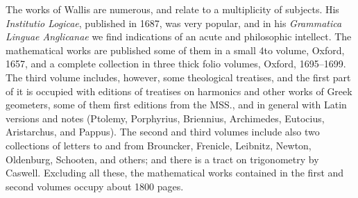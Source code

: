 \documentclass[11pt,a4paper]{article}
\begin{document}
The works of Wallis are numerous, and relate to a multiplicity of subjects. His \textit{Institutio Logicae}, published in 1687, was very popular, and in his \textit{Grammatica Linguae Anglicanae} we find indications of an acute and philosophic intellect. The mathematical works are published some of them in a small 4to volume, Oxford, 1657, and a complete collection in three thick folio volumes, Oxford, 1695--1699. The third volume includes, however, some theological treatises, and the first part of it is occupied with editions of treatises on harmonics and other works of Greek geometers, some of them first editions from the MSS., and in general with Latin versions and notes (Ptolemy, Porphyrius, Briennius, Archimedes, Eutocius, Aristarchus, and Pappus). The second and third volumes include also two collections of letters to and from Brouncker, Frenicle, Leibnitz, Newton, Oldenburg, Schooten, and others; and there is a tract on trigonometry by Caswell. Excluding all these, the mathematical works contained in the first and second volumes occupy about 1800 pages.
\end{document}
